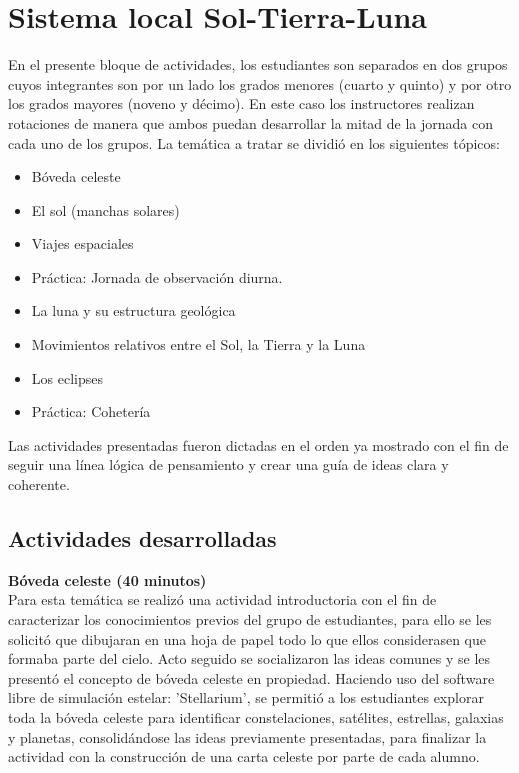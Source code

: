 \documentclass[a4paper,10pt]{article}
\begin{document}
\section{Sistema local Sol-Tierra-Luna }

\noindent En el presente bloque de actividades, los estudiantes son separados en dos grupos cuyos integrantes son por un lado los grados menores (cuarto y quinto) y por otro los grados mayores (noveno y décimo). En este caso los instructores realizan rotaciones de manera que ambos puedan desarrollar la mitad de la jornada con cada uno de los grupos. La temática a tratar se dividió en los siguientes tópicos:

\begin{itemize}
    \item Bóveda celeste

    \item El sol (manchas solares)

    \item Viajes espaciales

    \item Práctica: Jornada de observación diurna.

    \item La luna y su estructura geológica

    \item Movimientos relativos entre el Sol, la Tierra y la Luna
    
    \item Los eclipses
    
    \item Práctica: Cohetería
    
\end{itemize}


\noindent Las actividades presentadas fueron dictadas en el orden ya mostrado con el fin de seguir una línea lógica de pensamiento y crear una guía de ideas clara y coherente. 

\subsection{Actividades desarrolladas}


\noindent \textbf{Bóveda celeste (40 minutos)}\\

\noindent Para esta temática se realizó una actividad introductoria con el fin de caracterizar los conocimientos previos del grupo de estudiantes, para ello se les solicitó que dibujaran en una hoja de papel todo lo que ellos considerasen que formaba parte del cielo. Acto seguido se socializaron las ideas comunes y se les presentó el concepto de bóveda celeste en propiedad. Haciendo uso del software libre de simulación estelar: 'Stellarium', se permitió a los estudiantes explorar toda la bóveda celeste para identificar constelaciones, satélites, estrellas, galaxias y planetas, consolidándose las ideas previamente presentadas, para finalizar la actividad con la construcción de una carta celeste por parte de cada alumno.\\
\end{document}
